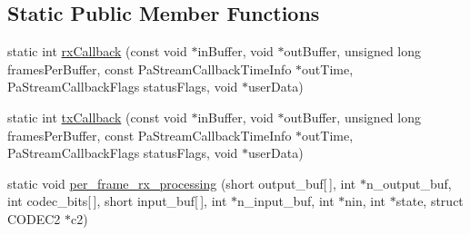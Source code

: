 \subsection*{Static Public Member Functions}
\begin{DoxyCompactItemize}
\item 
static int \hyperlink{class_main_frame_a45e054e7f42f10088a699821a169d295}{rx\-Callback} (const void $\ast$in\-Buffer, void $\ast$out\-Buffer, unsigned long frames\-Per\-Buffer, const Pa\-Stream\-Callback\-Time\-Info $\ast$out\-Time, Pa\-Stream\-Callback\-Flags status\-Flags, void $\ast$user\-Data)
\item 
static int \hyperlink{class_main_frame_afca7a385e843876355c50833e5ea4edb}{tx\-Callback} (const void $\ast$in\-Buffer, void $\ast$out\-Buffer, unsigned long frames\-Per\-Buffer, const Pa\-Stream\-Callback\-Time\-Info $\ast$out\-Time, Pa\-Stream\-Callback\-Flags status\-Flags, void $\ast$user\-Data)
\item 
static void \hyperlink{class_main_frame_af9f4cfb8469872efd9c057d1bc215f08}{per\-\_\-frame\-\_\-rx\-\_\-processing} (short output\-\_\-buf\mbox{[}$\,$\mbox{]}, int $\ast$n\-\_\-output\-\_\-buf, int codec\-\_\-bits\mbox{[}$\,$\mbox{]}, short input\-\_\-buf\mbox{[}$\,$\mbox{]}, int $\ast$n\-\_\-input\-\_\-buf, int $\ast$nin, int $\ast$state, struct C\-O\-D\-E\-C2 $\ast$c2)
\end{DoxyCompactItemize}
